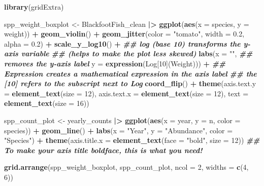 \documentclass[
  10pt,
  letterpaper,
  twoside,
  openright]{book}
\newenvironment{Shaded}{\begin{snugshade}}{\end{snugshade}}
\newcommand{\AttributeTok}[1]{\textcolor[rgb]{0.13,0.29,0.53}{#1}}
\newcommand{\DecValTok}[1]{\textcolor[rgb]{0.00,0.00,0.81}{#1}}
\newcommand{\DocumentationTok}[1]{\textcolor[rgb]{0.56,0.35,0.01}{\textbf{\textit{#1}}}}
\newcommand{\FloatTok}[1]{\textcolor[rgb]{0.00,0.00,0.81}{#1}}
\newcommand{\FunctionTok}[1]{\textcolor[rgb]{0.13,0.29,0.53}{\textbf{#1}}}
\newcommand{\NormalTok}[1]{#1}
\newcommand{\OtherTok}[1]{\textcolor[rgb]{0.56,0.35,0.01}{#1}}
\newcommand{\SpecialCharTok}[1]{\textcolor[rgb]{0.81,0.36,0.00}{\textbf{#1}}}
\newcommand{\StringTok}[1]{\textcolor[rgb]{0.31,0.60,0.02}{#1}}
\begin{document}
\begin{Shaded}
\begin{Highlighting}[]
\FunctionTok{library}\NormalTok{(gridExtra)}

\NormalTok{spp\_weight\_boxplot }\OtherTok{\textless{}{-}}\NormalTok{ BlackfootFish\_clean }\SpecialCharTok{|\textgreater{}} 
  \FunctionTok{ggplot}\NormalTok{(}\FunctionTok{aes}\NormalTok{(}\AttributeTok{x =}\NormalTok{ species, }\AttributeTok{y =}\NormalTok{ weight)) }\SpecialCharTok{+}
  \FunctionTok{geom\_violin}\NormalTok{() }\SpecialCharTok{+}
  \FunctionTok{geom\_jitter}\NormalTok{(}\AttributeTok{color =} \StringTok{"tomato"}\NormalTok{, }\AttributeTok{width =} \FloatTok{0.2}\NormalTok{, }\AttributeTok{alpha =} \FloatTok{0.2}\NormalTok{) }\SpecialCharTok{+}
  \FunctionTok{scale\_y\_log10}\NormalTok{() }\SpecialCharTok{+}
  \DocumentationTok{\#\# log (base 10) transforms the y{-}axis variable}
  \DocumentationTok{\#\# (helps to make the plot less skewed)}
  \FunctionTok{labs}\NormalTok{(}\AttributeTok{x =} \StringTok{""}\NormalTok{, }
       \DocumentationTok{\#\# removes the y{-}axis label}
       \AttributeTok{y =} \FunctionTok{expression}\NormalTok{(Log[}\DecValTok{10}\NormalTok{](Weight))) }\SpecialCharTok{+}
       \DocumentationTok{\#\# Expression creates a mathematical expression in the axis label}
       \DocumentationTok{\#\# the [10] refers to the subscript next to Log}
  \FunctionTok{coord\_flip}\NormalTok{() }\SpecialCharTok{+} 
  \FunctionTok{theme}\NormalTok{(}\AttributeTok{axis.text.y =} \FunctionTok{element\_text}\NormalTok{(}\AttributeTok{size =} \DecValTok{12}\NormalTok{), }
        \AttributeTok{axis.text.x =} \FunctionTok{element\_text}\NormalTok{(}\AttributeTok{size =} \DecValTok{12}\NormalTok{), }
        \AttributeTok{text =} \FunctionTok{element\_text}\NormalTok{(}\AttributeTok{size =} \DecValTok{16}\NormalTok{))}

\NormalTok{spp\_count\_plot }\OtherTok{\textless{}{-}}\NormalTok{ yearly\_counts }\SpecialCharTok{|\textgreater{}} 
  \FunctionTok{ggplot}\NormalTok{(}\FunctionTok{aes}\NormalTok{(}\AttributeTok{x =}\NormalTok{ year, }\AttributeTok{y =}\NormalTok{ n, }\AttributeTok{color =}\NormalTok{ species)) }\SpecialCharTok{+}
  \FunctionTok{geom\_line}\NormalTok{() }\SpecialCharTok{+} 
  \FunctionTok{labs}\NormalTok{(}\AttributeTok{x =} \StringTok{"Year"}\NormalTok{, }
       \AttributeTok{y =} \StringTok{"Abundance"}\NormalTok{, }
       \AttributeTok{color =} \StringTok{"Species"}\NormalTok{) }\SpecialCharTok{+}
  \FunctionTok{theme}\NormalTok{(}\AttributeTok{axis.title.x =} \FunctionTok{element\_text}\NormalTok{(}\AttributeTok{face =} \StringTok{"bold"}\NormalTok{, }\AttributeTok{size =} \DecValTok{12}\NormalTok{))}
  \DocumentationTok{\#\# To make your axis title boldface, this is what you need!}

\FunctionTok{grid.arrange}\NormalTok{(spp\_weight\_boxplot, spp\_count\_plot, }\AttributeTok{ncol =} \DecValTok{2}\NormalTok{, }\AttributeTok{widths =} \FunctionTok{c}\NormalTok{(}\DecValTok{4}\NormalTok{, }\DecValTok{6}\NormalTok{))}
\end{Highlighting}
\end{Shaded}
\end{document}
